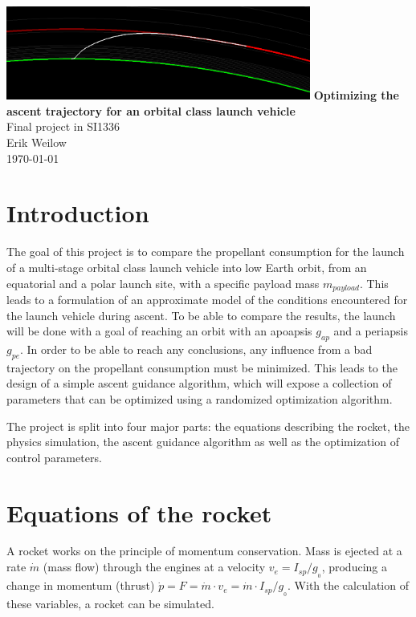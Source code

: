 \documentclass[11pt]{article}
\begin{document}
\begin{titlepage}
  \centering
  \vfill
  \vfill
  \includegraphics[width=0.75\textwidth]{./220km.png}
  \vskip3cm
  {\Large
  \textbf{Optimizing the ascent trajectory for an orbital class launch vehicle}\\
  \vskip0.25cm
  Final project in SI1336\\
      \vskip1cm
      Erik Weilow\\
      \vskip0.5cm
      \today\\
  }    
  \vfill
  \vfill
\end{titlepage}
\newpage

\section{Introduction} \label{sec:intro}
The goal of this project is to compare the propellant consumption for the launch of a multi-stage orbital class launch vehicle into low Earth orbit, from an equatorial and a polar launch site, with a specific payload mass $m_{payload}$. This leads to a formulation of an approximate model of the conditions encountered for the launch vehicle during ascent. 
To be able to compare the results, the launch will be done with a goal of reaching an orbit with an apoapsis $g_{ap}$ and a periapsis $g_{pe}$. 
In order to be able to reach any conclusions, any influence from a bad trajectory on the propellant consumption must be minimized.
This leads to the design of a simple ascent guidance algorithm, which will expose a collection of parameters that can be optimized using a 
randomized optimization algorithm.

The project is split into four major parts: the equations describing the rocket, the physics simulation, the ascent guidance algorithm as well as the optimization of control parameters.

\section{Equations of the rocket}
A rocket works on the principle of momentum conservation. 
Mass is ejected at a rate $\dot{m}$ (mass flow) through the engines at a velocity $v_{e} = I_{sp} / g_{_0}$, 
producing a change in momentum (thrust) $\dot{p} = F = \dot{m} \cdot v_{e} = \dot{m} \cdot I_{sp} / g_{_0}$. 
With the calculation of these variables, a rocket can be simulated.
\end{document}
